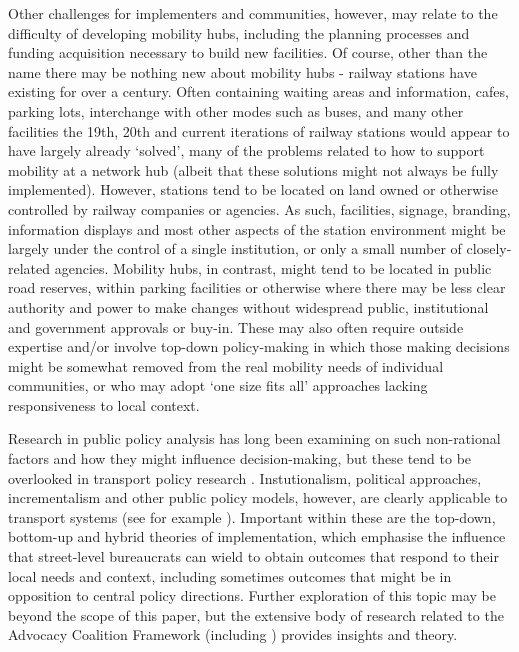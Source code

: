 \documentclass[preprint, 3p,
authoryear]{elsarticle} %
\begin{document}
Other challenges for implementers and communities, however, may relate
to the difficulty of developing mobility hubs, including the planning
processes and funding acquisition necessary to build new facilities. Of
course, other than the name there may be nothing new about mobility hubs
- railway stations have existing for over a century. Often containing
waiting areas and information, cafes, parking lots, interchange with
other modes such as buses, and many other facilities the 19th, 20th and
current iterations of railway stations would appear to have largely
already `solved', many of the problems related to how to support
mobility at a network hub (albeit that these solutions might not always
be fully implemented). However, stations tend to be located on land
owned or otherwise controlled by railway companies or agencies. As such,
facilities, signage, branding, information displays and most other
aspects of the station environment might be largely under the control of
a single institution, or only a small number of closely-related
agencies. Mobility hubs, in contrast, might tend to be located in public
road reserves, within parking facilities or otherwise where there may be
less clear authority and power to make changes without widespread
public, institutional and government approvals or buy-in. These may also
often require outside expertise and/or involve top-down policy-making in
which those making decisions might be somewhat removed from the real
mobility needs of individual communities, or who may adopt `one size
fits all' approaches lacking responsiveness to local context.

Research in public policy analysis has long been examining on such
non-rational factors and how they might influence decision-making, but
these tend to be overlooked in transport policy research
\citep{Marsden:2017aa}. Instutionalism, political approaches,
incrementalism and other public policy models, however, are clearly
applicable to transport systems (see for example
\citet{Reynolds:2017ah}). Important within these are the top-down,
bottom-up and hybrid theories of implementation, which emphasise the
influence that street-level bureaucrats can wield to obtain outcomes
that respond to their local needs and context, including sometimes
outcomes that might be in opposition to central policy directions.
Further exploration of this topic may be beyond the scope of this paper,
but the extensive body of research related to the Advocacy Coalition
Framework (including
\citet{Sabatier:1986aa,Sabatier:1987aa,Sabatier:1988aa,Sabatier:1993aa,Weible:2009aa,Weible:2007aa})
provides insights and theory.
\end{document}
